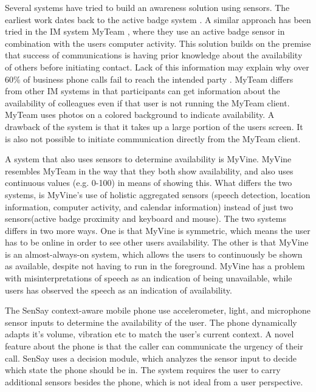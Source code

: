\documentclass{sigchi}
\begin{document}
Several systems have tried to build an awareness solution using sensors.
The earliest work dates back to the active badge system \cite{want1992active}.
A similar approach has been tried in the IM system MyTeam \cite{lai2003myteam}, where they use an active badge sensor in combination with the users computer activity.
This solution builds on the premise that success of communications is having prior knowledge about the availability of others before initiating contact.
Lack of this information may explain why over 60\% of business phone calls fail to reach the intended party \cite{whittaker1995rethinking}.
MyTeam differs from other IM systems in that participants can get information about the availability of colleagues even if that user is not running the MyTeam client.
MyTeam uses photos on a colored background to indicate availability.
A drawback of the system is that it takes up a large portion of the users screen. It is also not possible to initiate communication directly from the MyTeam client.

A system that also uses sensors to determine availability is MyVine\cite{fogarty2004myvine}.
MyVine resembles MyTeam in the way that they both show availability, and also uses continuous values (e.g. 0-100) in means of showing this.
What differs the two systems, is MyVine’s use of holistic aggregated sensors (speech
detection, location information, computer activity, and calendar information) instead of just two sensors(active badge proximity and keyboard and mouse).
The two systems differs in two more ways.
One is that MyVine is symmetric, which means the user has to be online in order to see other users availability.
The other is that MyVine is an almost-always-on system, which allows the users to continuously be shown as available, despite not having to run in the foreground.
MyVine has a problem with misinterpretations of speech as an indication of being unavailable, while users has observed the speech as an indication of availability.

The SenSay context-aware mobile phone \cite{siewiorek2003sensay} use accelerometer, light, and microphone sensor inputs to determine the availability of the user.
The phone dynamically adapts it’s volume, vibration etc to match the user's current context.
A novel feature about the phone is that the caller can communicate the urgency of their call.
SenSay uses a decision module, which analyzes the sensor input to decide which state the phone should be in.
The system requires the user to carry additional sensors besides the phone, which is not ideal from a user perspective.
\end{document}

